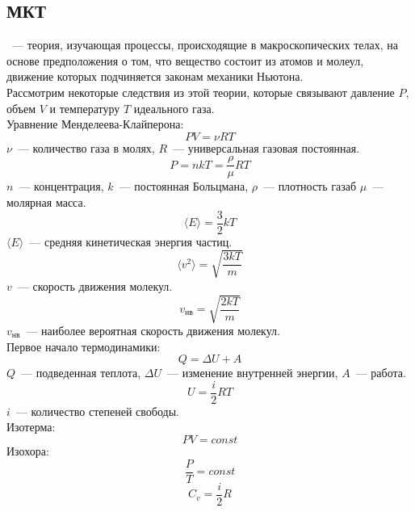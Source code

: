 \subsection{МКТ}
~--- теория, изучающая процессы, происходящие в макроскопических телах, на основе предположения о том, что вещество состоит из атомов и молеул, движение которых подчиняется законам механики Ньютона.\\
Рассмотрим некоторые следствия из этой теории, которые связывают давление $P$, объем $V$ и температуру $T$ идеального газа.\\
Уравнение Менделеева-Клайперона:
\begin{equation}
PV = \nu R T 
\end{equation}
$\nu$~--- количество газа в молях, $R$~--- универсальная газовая постоянная.
\begin{equation}
P = nkT =  \frac{\rho}{\mu}RT
\end{equation}
$n$~--- концентрация, $k$~--- постоянная Больцмана, $\rho$~--- плотность газаб $\mu$~--- молярная масса.
\begin{equation}
\langle E \rangle = \frac{3}{2}kT
\end{equation}
$\langle E \rangle$~--- средняя кинетическая энергия частиц.
\begin{equation}
\langle v^2 \rangle = \sqrt{\frac{3kT}{m}}
\end{equation}
$v$~--- скорость движения молекул.
\begin{equation}
v_\text{нв} = \sqrt{\frac{2kT}{m}}
\end{equation}
$v_\text{нв}$~--- наиболее вероятная скорость движения молекул.\\
Первое начало термодинамики:
\begin{equation}
Q = \Delta U + A
\end{equation}
$Q$~--- подведенная теплота, $\Delta U$~--- изменение внутренней энергии, $A$~--- работа.\\
\begin{equation}
U = \frac{i}{2}RT
\end{equation}
$i$~--- количество степеней свободы.\\
Изотерма:
\begin{equation}
PV = const
\end{equation}
Изохора:
\begin{equation}
\frac{P}{T} = const
\end{equation}
\begin{equation}
C_v = \frac{i}{2}R
\end{equation}
